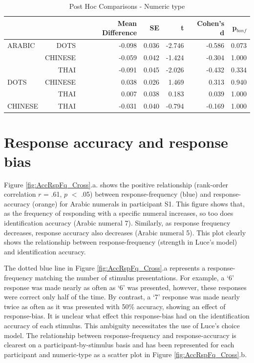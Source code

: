 \begin{table}[ht]
	\centering
	\caption{Post Hoc Comparisons - Numeric type}
	\begin{tabular}{lrrrrrr}
		\hline
		 &  & Mean Difference & SE & t & Cohen's d & p$_{bonf}$  \\
		\hline
		ARABIC & DOTS & -0.098 & 0.036 & -2.746 & -0.586 & 0.073  \\
		  & CHINESE & -0.059 & 0.042 & -1.424 & -0.304 & 1.000  \\
		 & THAI & -0.091 & 0.045 & -2.026 & -0.432 & 0.334  \\
		DOTS & CHINESE & 0.038 & 0.026 & 1.469 & 0.313 & 0.940  \\
		  & THAI & 0.007 & 0.038 & 0.183 & 0.039 & 1.000  \\
		CHINESE & THAI & -0.031 & 0.040 & -0.794 & -0.169 & 1.000  \\
		\hline
	\end{tabular} 
\label{app:ttest_comparison}
\end{table}



\section{Response accuracy and response bias} 
\label{Appendix:Bias}

Figure \ref{fig:AccRspFq_Cross}.a. shows the positive relationship (rank-order correlation $r$ = .61, $p$ $<$ .05) between response-frequency (blue) and response-accuracy (orange) for Arabic numerals in participant S1. This figure shows that, as the frequency of responding with a specific numeral increases, so too does identification accuracy  (\eg Arabic numeral 7). Similarly, as response frequency decreases, response accuracy also decreases (\eg Arabic numeral 5). This plot clearly shows the relationship between response-frequency (strength in Luce's model) and identification accuracy.

The dotted blue line in Figure \ref{fig:AccRspFq_Cross}.a represents a response-frequency matching the number of stimulus presentations. For example, a `6' response was made nearly as often as `6' was presented, however, these responses were correct only half of the time. By contrast, a `7' response was made nearly twice as often as it was presented with 50\% accuracy, showing an effect of response-bias. It is unclear what effect this response-bias had on the identification accuracy of each stimulus. This ambiguity necessitates the use of Luce's choice model. The relationship between response-frequency and response-accuracy is clearest on a participant-by-stimulus basis and has been represented for each participant and numeric-type as a scatter plot in Figure \ref{fig:AccRspFq_Cross}.b.


